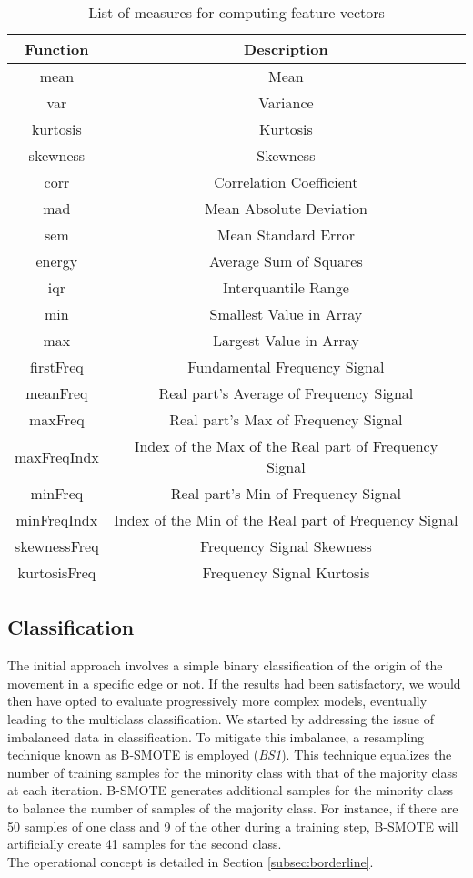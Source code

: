 \begin{table}[H]
    \centering
    \begin{tabular}{||c||c||}
        \hline
        \textbf{Function} & \textbf{Description} \\
        \hline
        mean & Mean \\
        var & Variance \\
        kurtosis & Kurtosis \\
        skewness & Skewness \\
        corr & Correlation Coefficient \\
        mad & Mean Absolute Deviation \\
        sem & Mean Standard Error \\
        energy & Average Sum of Squares \\
        iqr & Interquantile Range \\
        min & Smallest Value in Array \\
        max & Largest Value in Array \\
        firstFreq & Fundamental Frequency Signal \\
        meanFreq & Real part's Average of Frequency Signal \\
        maxFreq & Real part's Max of Frequency Signal \\
        maxFreqIndx & Index of the Max of the Real part of Frequency Signal \\ 
        minFreq & Real part's Min of Frequency Signal \\
        minFreqIndx & Index of the Min of the Real part of Frequency Signal \\ 
        skewnessFreq & Frequency Signal Skewness \\
        kurtosisFreq & Frequency Signal Kurtosis \\
        \hline
    \end{tabular}
    \caption{List of measures for computing feature vectors}
\label{tab:ml_features}
\end{table}

\subsection{Classification}
The initial approach involves a simple binary classification of the origin of the movement in a specific edge or not.
If the results had been satisfactory, we would then have opted to evaluate progressively more complex models, eventually leading to the multiclass classification.
We started by addressing the issue of imbalanced data in classification.
To mitigate this imbalance, a resampling technique known as B-SMOTE is employed (\textit{BS1}). 
This technique equalizes the number of training samples for the minority class with that of the majority class at each iteration.
B-SMOTE generates additional samples for the minority class to balance the number of samples of the majority class.
For instance, if there are 50 samples of one class and 9 of the other during a training step, B-SMOTE will artificially create 41 samples for the second class. \\
The operational concept is detailed in Section \ref{subsec:borderline}.

